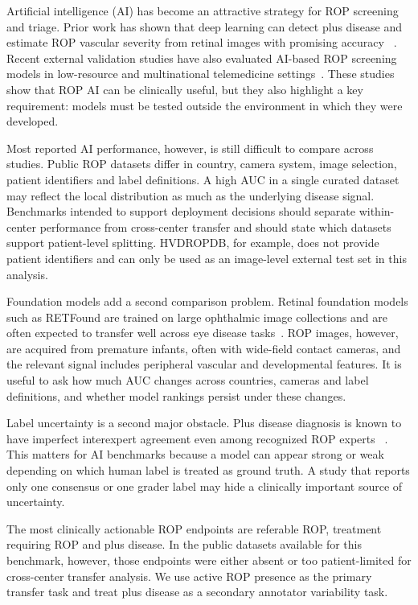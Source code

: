 \documentclass[pdflatex,sn-vancouver,Numbered,iicol]{sn-jnl}
\begin{document}
Artificial intelligence (AI) has become an attractive strategy for ROP screening
and triage. Prior work has shown that deep learning can detect plus disease and
estimate ROP vascular severity from retinal images with promising accuracy
~\cite{brown2018,campbell2021ai}. Recent external validation studies have also
evaluated AI-based ROP screening models in low-resource and multinational
telemedicine settings~\cite{coyner2022,coyner2024}. These studies show that ROP
AI can be clinically useful, but they also highlight a key requirement: models
must be tested outside the environment in which they were developed.

Most reported AI performance, however, is still difficult to compare across
studies. Public ROP datasets differ in country, camera system, image selection,
patient identifiers and label definitions. A high AUC in a single curated dataset
may reflect the local distribution as much as the underlying disease signal.
Benchmarks intended to support deployment decisions should separate within-center
performance from cross-center transfer and should state which datasets support
patient-level splitting. HVDROPDB, for example, does not provide patient
identifiers and can only be used as an image-level external test set in this
analysis.

Foundation models add a second comparison problem. Retinal foundation models such
as RETFound are trained on large ophthalmic image collections and are often
expected to transfer well across eye disease tasks~\cite{retfound2023}. ROP
images, however, are acquired from premature infants, often with wide-field
contact cameras, and the relevant signal includes peripheral vascular and
developmental features. It is useful to ask how much AUC changes across countries,
cameras and label definitions, and whether model rankings persist under these
changes.

Label uncertainty is a second major obstacle. Plus disease diagnosis is known to
have imperfect interexpert agreement even among recognized ROP experts
~\cite{chiang2007}. This matters for AI benchmarks because a model can appear
strong or weak depending on which human label is treated as ground truth. A
study that reports only one consensus or one grader label may hide a clinically
important source of uncertainty.

The most clinically actionable ROP endpoints are referable ROP, treatment
requiring ROP and plus disease. In the public datasets available for this
benchmark, however, those endpoints were either absent or too patient-limited for
cross-center transfer analysis. We use active ROP presence as
the primary transfer task and treat plus disease as a secondary annotator
variability task.
\end{document}

